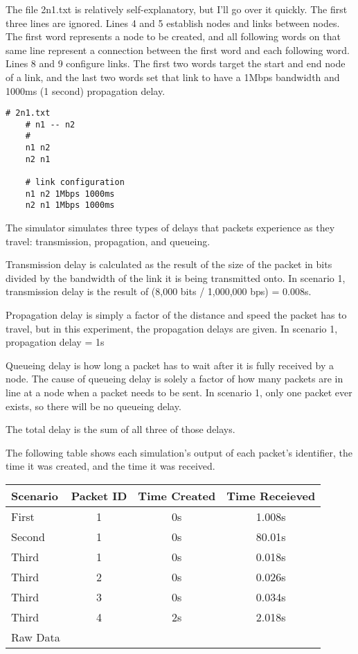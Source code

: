 \documentclass[11pt]{article}
\begin{document}
The file 2n1.txt is relatively self-explanatory, but I'll go over it quickly. The first three lines are ignored. Lines 4 and 5 establish nodes and links between nodes. The first word represents a node to be created, and all following words on that same line represent a connection between the first word and each following word. Lines 8 and 9 configure links. The first two words target the start and end node of a link, and the last two words set that link to have a 1Mbps bandwidth and 1000ms (1 second) propagation delay.

\vspace{5mm}
\begin{absolutelynopagebreak}
\begin{lstlisting}
# 2n1.txt
    # n1 -- n2
    #
    n1 n2
    n2 n1

    # link configuration
    n1 n2 1Mbps 1000ms
    n2 n1 1Mbps 1000ms
\end{lstlisting}
\end{absolutelynopagebreak}
\vspace{5mm}

The simulator simulates three types of delays that packets experience as they travel: transmission, propagation, and queueing. 

Transmission delay is calculated as the result of the size of the packet in bits divided by the bandwidth of the link it is being transmitted onto. In scenario 1, transmission delay is the result of (8,000 bits / 1,000,000 bps) = 0.008s.

Propagation delay is simply a factor of the distance and speed the packet has to travel, but in this experiment, the propagation delays are given. In scenario 1, propagation delay = 1s

Queueing delay is how long a packet has to wait after it is fully received by a node. The cause of queueing delay is solely a factor of how many packets are in line at a node when a packet needs to be sent. In scenario 1, only one packet ever exists, so there will be no queueing delay.

The total delay is the sum of all three of those delays.

The following table shows each simulation's output of each packet's identifier, the time it was created, and the time it was received.

\vspace{0.5cm}
\begin{absolutelynopagebreak}
\begin{tabular}{lccc}
  \toprule
  Scenario & Packet ID & Time Created & Time Receieved\\
  \midrule
  First & 1 & 0s & 1.008s \\
  Second & 1 & 0s & 80.01s \\
  Third & 1 & 0s & 0.018s \\
  Third & 2 & 0s & 0.026s \\
  Third & 3 & 0s & 0.034s \\
  Third & 4 & 2s & 2.018s \\
  \bottomrule
  Raw Data
\end{tabular}
\end{absolutelynopagebreak}
\vspace{0.5cm}
\end{document}
